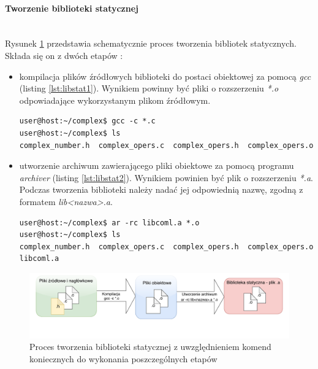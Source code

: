 \paragraph*{Tworzenie biblioteki statycznej}\mbox{}\\
Rysunek \ref{fig:staticlibflow} przedstawia schematycznie proces tworzenia bibliotek statycznych. Składa się on z dwóch etapów \cite{Static1}:
\begin{itemize}
\item kompilacja plików źródłowych biblioteki do postaci obiektowej za pomocą \textit{gcc} (listing \ref{lst:libstat1}). Wynikiem powinny być pliki o rozszerzeniu \textit{*.o} odpowiadające wykorzystanym plikom źródłowym.

\begin{lstlisting}[style=Cmd, caption={Kompilacja plików źródłowych biblioteki do postaci obiektowej - polecenie oraz jego wynik},label={lst:libstat1}]
user@host:~/complex$ gcc -c *.c
user@host:~/complex$ ls
complex_number.h  complex_opers.c  complex_opers.h  complex_opers.o
\end{lstlisting}


\item utworzenie archiwum zawierającego pliki obiektowe za pomocą programu \textit{archiver} (listing \ref{lst:libstat2}). Wynikiem powinien być plik o rozszerzeniu \textit{*.a}. Podczas tworzenia biblioteki należy nadać jej odpowiednią nazwę, zgodną z formatem \textit{lib<nazwa>.a}.

\begin{lstlisting}[style=Cmd, caption={Utworzenie biblioteki statycznej z plików obiektowych - polecenie oraz jego wynik},label={lst:libstat2}]
user@host:~/complex$ ar -rc libcoml.a *.o
user@host:~/complex$ ls
complex_number.h  complex_opers.c  complex_opers.h  complex_opers.o  libcoml.a
\end{lstlisting}

\end{itemize}

\begin{figure}[H]
\centering
\caption{Proces tworzenia biblioteki statycznej z uwzględnieniem komend koniecznych do wykonania poszczególnych etapów \cite{Compiling}}
\label{fig:staticlibflow}
\includegraphics[width=\textwidth]{res/StaticLibFlow}
\end{figure}

